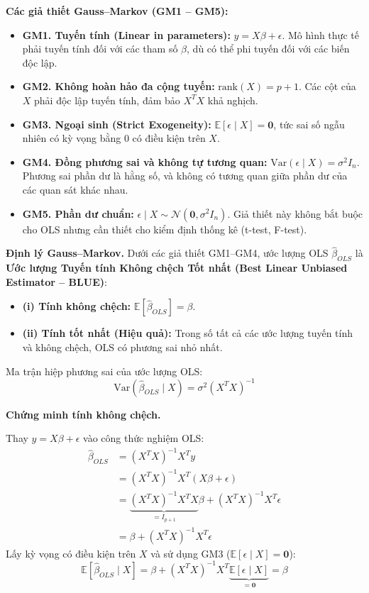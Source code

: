 \documentclass[a4paper]{article}
\begin{document}
\textbf{Các giả thiết Gauss--Markov (GM1 -- GM5):}
\begin{itemize}
    \item \textbf{GM1. Tuyến tính (Linear in parameters):} $y = X\beta + \epsilon$. Mô hình thực tế phải tuyến tính đối với các tham số $\beta$, dù có thể phi tuyến đối với các biến độc lập.
    \item \textbf{GM2. Không hoàn hảo đa cộng tuyến:} $\text{rank}(X) = p + 1$. Các cột của $X$ phải độc lập tuyến tính, đảm bảo $X^TX$ khả nghịch.
    \item \textbf{GM3. Ngoại sinh (Strict Exogeneity):} $\mathbb{E}[\epsilon \mid X] = \mathbf{0}$, tức sai số ngẫu nhiên có kỳ vọng bằng 0 có điều kiện trên $X$.
    \item \textbf{GM4. Đồng phương sai và không tự tương quan:} $\text{Var}(\epsilon \mid X) = \sigma^2 I_n$. Phương sai phần dư là hằng số, và không có tương quan giữa phần dư của các quan sát khác nhau.
    \item \textbf{GM5. Phần dư chuẩn:} $\epsilon \mid X \sim \mathcal{N}(\mathbf{0}, \sigma^2 I_n)$. Giả thiết này không bắt buộc cho OLS nhưng cần thiết cho kiểm định thống kê (t-test, F-test).
\end{itemize}

\textbf{Định lý Gauss--Markov.} Dưới các giả thiết GM1--GM4, ước lượng OLS $\hat{\beta}_{OLS}$ là \textbf{Ước lượng Tuyến tính Không chệch Tốt nhất (Best Linear Unbiased Estimator -- BLUE)}:
\begin{itemize}
    \item \textbf{(i) Tính không chệch:} $\mathbb{E}[\hat{\beta}_{OLS}] = \beta$.
    \item \textbf{(ii) Tính tốt nhất (Hiệu quả):} Trong số tất cả các ước lượng tuyến tính và không chệch, OLS có phương sai nhỏ nhất.
\end{itemize}

Ma trận hiệp phương sai của ước lượng OLS:
\begin{equation}
\text{Var}(\hat{\beta}_{OLS} \mid X) = \sigma^2 (X^TX)^{-1}
\end{equation}

\textbf{Chứng minh tính không chệch.}

Thay $y = X\beta + \epsilon$ vào công thức nghiệm OLS:
\begin{align*}
\hat{\beta}_{OLS} &= (X^TX)^{-1}X^Ty \\
                   &= (X^TX)^{-1}X^T(X\beta + \epsilon) \\
                   &= \underbrace{(X^TX)^{-1}X^TX}_{=I_{p+1}}\beta + (X^TX)^{-1}X^T\epsilon \\
                   &= \beta + (X^TX)^{-1}X^T\epsilon
\end{align*}
Lấy kỳ vọng có điều kiện trên $X$ và sử dụng GM3 ($\mathbb{E}[\epsilon \mid X] = \mathbf{0}$):
$$\mathbb{E}[\hat{\beta}_{OLS} \mid X] = \beta + (X^TX)^{-1}X^T \underbrace{\mathbb{E}[\epsilon \mid X]}_{=\mathbf{0}} = \beta$$
\end{document}
